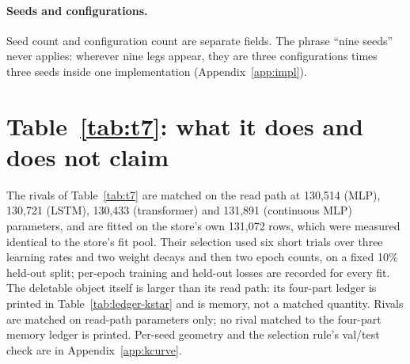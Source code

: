 \documentclass{article} %
\begin{document}
\paragraph{Seeds and configurations.} Seed count and configuration count are separate fields. The
phrase ``nine seeds'' never applies: wherever nine legs appear, they are three configurations
times three seeds inside one implementation (Appendix~\ref{app:impl}).

\section{Table~\ref{tab:t7}: what it does and does not claim}
\label{app:t7more}
The rivals of Table~\ref{tab:t7} are matched on the read path at 130,514 (MLP), 130,721 (LSTM), %
130,433 (transformer) and 131,891 (continuous MLP) parameters, and are fitted on the store's own %
131,072 rows, which were measured identical to the store's fit pool. Their selection used six short %
trials over three learning rates and two weight decays and then two epoch counts, on a fixed 10\%
held-out split; per-epoch training and held-out losses are recorded for every fit. %
The deletable object itself is larger than its read path: its four-part ledger is printed in
Table~\ref{tab:ledger-kstar} and is memory, not a matched quantity. Rivals are matched on read-path
parameters only; no rival matched to the four-part memory ledger is printed.
Per-seed geometry and the selection rule's val/test check are in Appendix~\ref{app:kcurve}.
\end{document}
